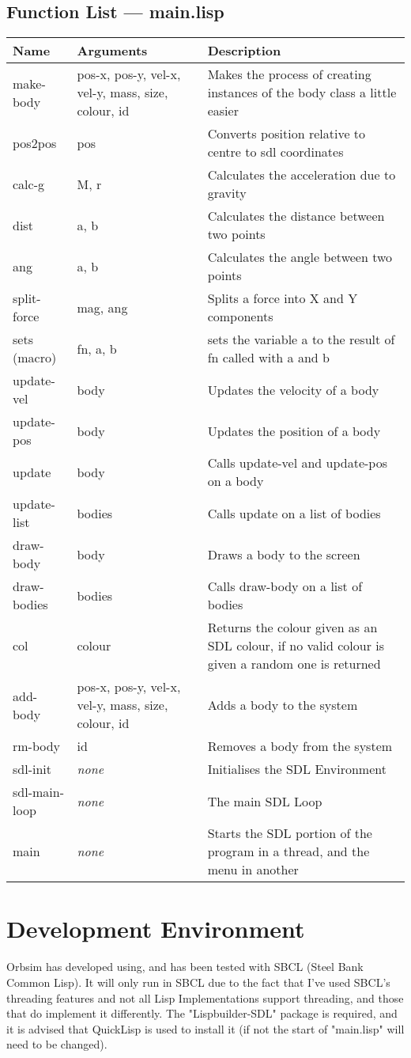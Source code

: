\subsection{Function List --- main.lisp}
\begin{tabular}{p{}p{}p{}}
	Name & Arguments & Description\\ \hline
	make-body & pos-x, pos-y, vel-x, vel-y, mass, size, colour, id &
		Makes the process of creating instances of the body class a
		little easier\\
	pos2pos & pos & Converts position relative to centre to sdl coordinates
	\\
	calc-g & M, r & Calculates the acceleration due to gravity \\
	dist & a, b & Calculates the distance between two points \\
	ang & a, b & Calculates the angle between two points \\
	split-force & mag, ang & Splits a force into X and Y components \\
	sets (macro) & fn, a, b & sets the variable a to the result of fn called
	with a and b \\
	update-vel & body & Updates the velocity of a body \\
	update-pos & body & Updates the position of a body \\
	update & body & Calls update-vel and update-pos on a body \\
	update-list & bodies & Calls update on a list of bodies \\
	draw-body & body & Draws a body to the screen \\
	draw-bodies & bodies & Calls draw-body on a list of bodies \\
	col & colour & Returns the colour given as an SDL colour, if no valid
	colour is given a random one is returned \\
	add-body & pos-x, pos-y, vel-x, vel-y, mass, size, colour, id & Adds a
	body to the system \\
	rm-body & id & Removes a body from the system \\
	sdl-init & \emph{none} & Initialises the SDL Environment \\
	sdl-main-loop & \emph{none} & The main SDL Loop \\
	main & \emph{none} & Starts the SDL portion of the program in a thread,
	and the menu in another
\end{tabular}


\section{Development Environment}
Orbsim has developed using, and has been tested with SBCL (Steel Bank Common
Lisp). It will only run in SBCL due to the fact that I've used SBCL's threading
features and not all Lisp Implementations support threading, and those that do
implement it differently. The "Lispbuilder-SDL" package is required, and it is
advised that QuickLisp is used to install it (if not the start of "main.lisp"
will need to be changed). 

